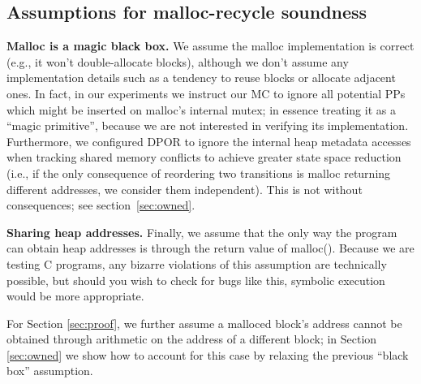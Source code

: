 \subsection{Assumptions for malloc-recycle soundness}

{\bf Malloc is a magic black box.}
We assume the malloc implementation is correct (e.g., it won't double-allocate blocks), although we don't assume any implementation details such as a tendency to reuse blocks or allocate adjacent ones.
In fact, in our experiments we instruct our MC to ignore all potential PPs which might be inserted on malloc's internal mutex;
in essence treating it as a ``magic primitive'', because we are not interested in verifying its implementation.
Furthermore, we configured DPOR to ignore the internal heap metadata accesses
when tracking shared memory conflicts to achieve greater state space reduction
(i.e., if the only consequence of reordering two transitions is malloc returning different addresses, we consider them independent).
This is not without consequences; see section~\ref{sec:owned}.

{\bf Sharing heap addresses.}
Finally, we assume that the only way the program can obtain heap addresses is through the return value of malloc().
Because we are testing C programs, any bizarre violations of this assumption are technically possible,
but should you wish to check for bugs like this,
symbolic execution \cite{klee} would be more appropriate.

For Section \ref{sec:proof}, we further assume a malloced block's address cannot be obtained through arithmetic on the address of a different block; in Section \ref{sec:owned} we show how to account for this case by relaxing the previous ``black box'' assumption.
